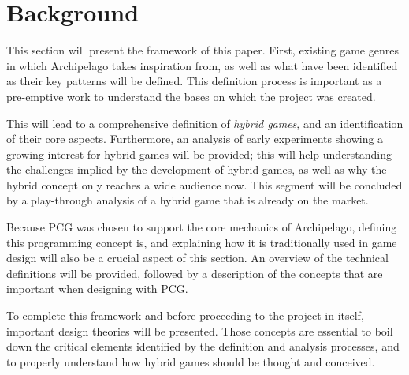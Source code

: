 \chapter{Background}
This section will present the framework of this paper. First, existing game genres in which Archipelago takes inspiration from, as well as what have been identified as their key patterns will be defined. This definition process is important as a pre-emptive work to understand the bases on which the project was created. 

This will lead to a comprehensive definition of \textit{hybrid games}, and an identification of their core aspects. Furthermore, an analysis of early experiments showing a growing interest for hybrid games will be provided; this will help understanding the challenges implied by the development of hybrid games, as well as why the hybrid concept only reaches a wide audience now. This segment will be concluded by a play-through analysis of a hybrid game that is already on the market.

Because PCG was chosen to support the core mechanics of Archipelago, defining this programming concept is, and explaining how it is traditionally used in game design will also be a crucial aspect of this section. An overview of the technical definitions will be provided, followed by a description of the concepts that are important when designing with PCG. 

To complete this framework and before proceeding to the project in itself, important design theories will be presented. Those concepts are essential to boil down the critical elements identified by the definition and analysis processes, and to properly understand how hybrid games should be thought and conceived.
